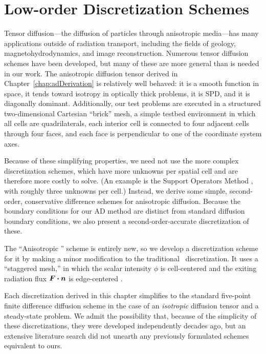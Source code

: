 
\chapter{Low-order Discretization Schemes} \label{chap:implementation}

Tensor diffusion---the diffusion of particles through anisotropic media---has
many applications outside of radiation transport, including the fields of geology,
magnetohydrodynamics, and image reconstruction. Numerous tensor diffusion
schemes have been developed, but many of these are more general than is needed
in our work. The anisotropic diffusion tensor derived in
Chapter~\ref{chap:adDerivation} is relatively well behaved: it is a smooth
function in space, it tends toward isotropy in optically thick problems, it is
SPD, and it is diagonally dominant. Additionally, our test problems
are executed in a structured
two-dimensional Cartesian ``brick'' mesh, a simple testbed environment in which
all cells are
quadrilaterals, each interior cell is connected to four adjacent cells through
four faces, and each face is
perpendicular to one of the coordinate system axes.

Because of these simplifying properties, we need not use the more
complex discretization schemes, which have more unknowns
per spatial cell and are therefore more costly to solve.
(An example is the Support Operators Method \cite{Mor1998,Run2006}, with
roughly three unknowns per cell.) Instead, we derive some simple, second-order,
conservative
difference schemes for anisotropic diffusion. Because the
boundary conditions for our AD method are distinct from standard diffusion
boundary conditions, we also present a second-order-accurate discretization of
these.

The ``Anisotropic \Pone'' scheme is entirely new, so we develop a discretization
scheme for it by making a minor modification to the traditional \Pone\
discretization. It uses a ``staggered mesh,'' in which the scalar intensity
$\phi$ is cell-centered and the exiting radiation flux $\bm{F}\bm{\cdot} \bm{n}$ is
edge-centered \cite{War2003}.

Each discretization derived in this chapter simplifies to the standard
five-point finite difference diffusion scheme in the case of an
\emph{isotropic} diffusion tensor and a steady-state problem. We admit the
possibility that, because of the simplicity of these discretizations, they were
developed independently decades ago, but an extensive literature search did not
unearth any previously formulated schemes equivalent to ours.

